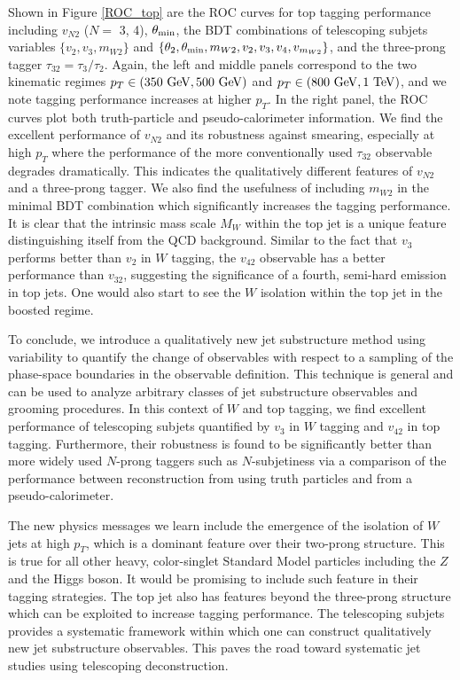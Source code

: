\documentclass[aps,prl,floatfix,preprintnumbers,twocolumn,groupedaddress,nofootinbib]{revtex4-1}
\begin{document}
Shown in Figure \ref{ROC_top} are the ROC curves for top tagging performance including $v_{N2}$ ($N = $ 3, 4), $\theta_{\rm min}$, the BDT combinations of telescoping subjets variables $\{v_2, v_3, m_{W2}\}$ and $\{\theta_2,\theta_{\rm min},m_{W2},v_2,v_3,v_4,v_{m_{W2}}\}$, and the three-prong tagger $\tau_{32}=\tau_{3}/\tau_{2}$. Again, the left and middle panels correspond to the two kinematic regimes $p_T \in (350~{\rm GeV}, 500~{\rm GeV})$ and $p_T \in (800~{\rm GeV}, 1~{\rm TeV})$, and we note tagging performance increases at higher $p_T$. In the right panel, the ROC curves plot both truth-particle and pseudo-calorimeter information. We find the excellent performance of $v_{N2}$ and its robustness against smearing, especially at high $p_T$ where the performance of the more conventionally used $\tau_{32}$ observable degrades dramatically. This indicates the qualitatively different features of $v_{N2}$ and a three-prong tagger. We also find the usefulness of including $m_{W2}$ in the minimal BDT combination which significantly increases the tagging performance. It is clear that the intrinsic mass scale $M_W$ within the top jet is a unique feature distinguishing itself from the QCD background. Similar to the fact that $v_3$ performs better than $v_2$ in $W$ tagging, the $v_{42}$ observable has a better performance than $v_{32}$, suggesting the significance of a fourth, semi-hard emission in top jets. One would also start to see the $W$ isolation within the top jet in the boosted regime.

To conclude, we introduce a qualitatively new jet substructure method using variability to quantify the change of observables with respect to a sampling of the phase-space boundaries in the observable definition. This technique is general and can be used to analyze arbitrary classes of jet substructure observables and grooming procedures. In this context of $W$ and top tagging, we find excellent performance of telescoping subjets quantified by $v_3$ in $W$ tagging and $v_{42}$ in top tagging. Furthermore, their robustness is found to be significantly better than more widely used $N$-prong taggers such as $N$-subjetiness via a comparison of the performance between reconstruction from using truth particles and from a pseudo-calorimeter.

The new physics messages we learn include the emergence of the isolation of $W$ jets at high $p_T$, which is a dominant feature over their two-prong structure. This is true for all other heavy, color-singlet Standard Model particles including the $Z$ and the Higgs boson. It would be promising to include such feature in their tagging strategies. The top jet also has features beyond the three-prong structure which can be exploited to increase tagging performance. The telescoping subjets provides a systematic framework within which one can construct qualitatively new jet substructure observables. This paves the road toward systematic jet studies using telescoping deconstruction.
\end{document}

